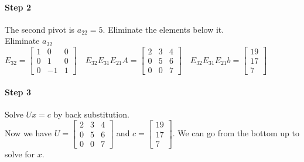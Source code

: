 \begin{examplex}
    \paragraph{Step 2}
    The second pivot is $a_{22} = 5$. Eliminate the elements below it. \\

    \vspace{0.4cm}
    Eliminate $a_{32}$ \qquad
    $
        E_{32} =
        \begin{bmatrix}
            1 & 0  & 0 \\
            0 & 1  & 0 \\
            0 & -1 & 1
        \end{bmatrix}
        \quad
        E_{32}E_{31}E_{21}A =
        \begin{bmatrix}
            2 & 3 & 4 \\
            0 & 5 & 6 \\
            0 & 0 & 7
        \end{bmatrix}
        \quad
        E_{32}E_{31}E_{21}b =
        \begin{bmatrix}
            19 \\ 17 \\ 7
        \end{bmatrix}
    $

    \paragraph{Step 3}
    Solve $Ux=c$ by back substitution. \\

    \vspace{0.4cm}
    Now we have $U = \begin{bmatrix}
            2 & 3 & 4 \\
            0 & 5 & 6 \\
            0 & 0 & 7
        \end{bmatrix}$
    and $c = \begin{bmatrix}
            19 \\ 17 \\ 7
        \end{bmatrix}$. We can go from the bottom up to solve for $x$.
\end{examplex}

